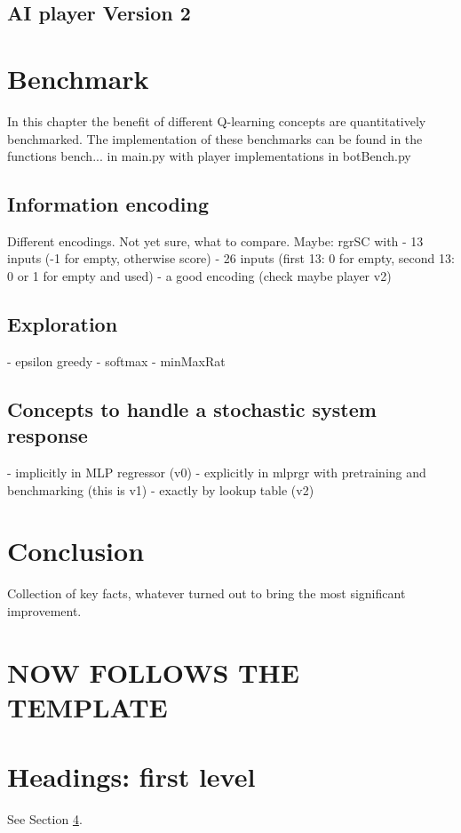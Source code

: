 \documentclass{article}
\begin{document}
\subsection{AI player Version 2}

\section{Benchmark}
In this chapter the benefit of different Q-learning concepts are quantitatively benchmarked.
The implementation of these benchmarks can be found in the functions bench... in main.py with player implementations in botBench.py
\subsection{Information encoding}
Different encodings. Not yet sure, what to compare.
Maybe: rgrSC with 
- 13 inputs (-1 for empty, otherwise score)
- 26 inputs (first 13: 0 for empty, second 13: 0 or 1 for empty and used)
- a good encoding (check maybe player v2)
\subsection{Exploration}
- epsilon greedy
- softmax
- minMaxRat
\subsection{Concepts to handle a stochastic system response}
- implicitly in MLP regressor (v0)
- explicitly in mlprgr with pretraining and benchmarking (this is v1)
- exactly by lookup table (v2)


\section{Conclusion}
Collection of key facts, whatever turned out to bring the most significant improvement.



\section{NOW FOLLOWS THE TEMPLATE}

\section{Headings: first level}
\label{sec:headings}

\lipsum[4] See Section \ref{sec:headings}.
\end{document}
